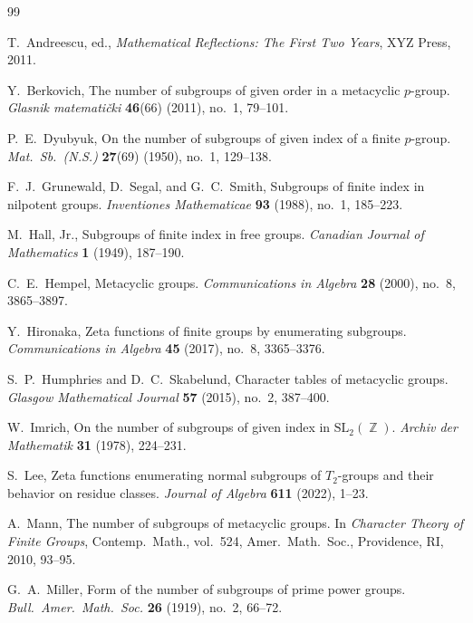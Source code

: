 \documentclass[onecolumn]{article}
\numberwithin{equation}{section}
\theoremstyle{mytheoremstyle}
\DeclareMathOperator{\Z}{\mathbb{Z}}
\begin{document}
\begin{thebibliography}{99}

T.~Andreescu, ed.,
\textit{Mathematical Reflections: The First Two Years},
XYZ Press, 2011.

Y.~Berkovich,
The number of subgroups of given order in a metacyclic $p$-group.
\textit{Glasnik matemati\v{c}ki} \textbf{46}(66) (2011), no.~1, 79--101.

P.~E.~Dyubyuk,
On the number of subgroups of given index of a finite $p$-group.
\textit{Mat.\ Sb.\ (N.S.)} \textbf{27}(69) (1950), no.~1, 129--138.

F.~J.~Grunewald, D.~Segal, and G.~C.~Smith,
Subgroups of finite index in nilpotent groups.
\textit{Inventiones Mathematicae} \textbf{93} (1988), no.~1, 185--223.

M.~Hall, Jr.,
Subgroups of finite index in free groups.
\textit{Canadian Journal of Mathematics} \textbf{1} (1949), 187--190.

C.~E.~Hempel,
Metacyclic groups.
\textit{Communications in Algebra} \textbf{28} (2000), no.~8, 3865--3897.

Y.~Hironaka,
Zeta functions of finite groups by enumerating subgroups.
\textit{Communications in Algebra} \textbf{45} (2017), no.~8, 3365--3376.

S.~P.~Humphries and D.~C.~Skabelund,
Character tables of metacyclic groups.
\textit{Glasgow Mathematical Journal} \textbf{57} (2015), no.~2, 387--400.

W.~Imrich,
On the number of subgroups of given index in $\mathrm{SL}_2(\Z)$.
\textit{Archiv der Mathematik} \textbf{31} (1978), 224--231.

S.~Lee,
Zeta functions enumerating normal subgroups of $T_2$-groups and their behavior on residue classes.
\textit{Journal of Algebra} \textbf{611} (2022), 1--23.

A.~Mann,
The number of subgroups of metacyclic groups.
In \textit{Character Theory of Finite Groups}, Contemp.\ Math., vol.~524,
Amer.\ Math.\ Soc., Providence, RI, 2010, 93--95.

G.~A.~Miller,
Form of the number of subgroups of prime power groups.
\textit{Bull.\ Amer.\ Math.\ Soc.} \textbf{26} (1919), no.~2, 66--72.


\end{thebibliography}
\end{document}
